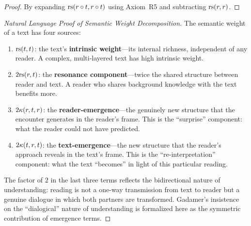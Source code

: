 \begin{proof}
By expanding $\mathrm{rs}(r \circ t, r \circ t)$ using Axiom~R5 and subtracting
$\mathrm{rs}(r, r)$.
\end{proof}

\begin{proof}[Natural Language Proof of Semantic Weight Decomposition]
The semantic weight of a text has four sources:

\begin{enumerate}
\item $\mathrm{rs}(t, t)$: the text's \textbf{intrinsic weight}---its internal
richness, independent of any reader.  A complex, multi-layered text has
high intrinsic weight.

\item $2\mathrm{rs}(r, t)$: the \textbf{resonance component}---twice the shared
structure between reader and text.  A reader who shares background knowledge
with the text benefits more.

\item $2\kappa(r, t, r)$: the \textbf{reader-emergence}---the genuinely
new structure that the encounter generates in the reader's frame.  This
is the ``surprise'' component: what the reader could not have predicted.

\item $2\kappa(t, r, t)$: the \textbf{text-emergence}---the new structure
that the reader's approach reveals in the text's frame.  This is the
``re-interpretation'' component: what the text ``becomes'' in light of
this particular reading.
\end{enumerate}

The factor of $2$ in the last three terms reflects the bidirectional nature
of understanding: reading is not a one-way transmission from text to reader
but a genuine dialogue in which both partners are transformed.  Gadamer's
insistence on the ``dialogical'' nature of understanding is formalized here
as the symmetric contribution of emergence terms.
\end{proof}

